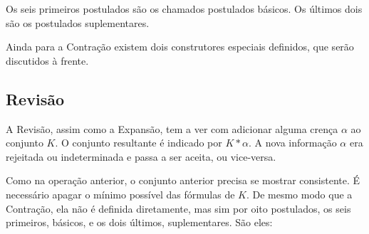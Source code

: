Os seis primeiros postulados são os chamados postulados básicos. Os últimos dois são os postulados suplementares.

Ainda para a Contração existem dois construtores especiais definidos, que serão discutidos à frente.

\subsection{Revisão}

A Revisão, assim como a Expansão, tem a ver com adicionar alguma crença $ \alpha $ ao conjunto $ K $. O conjunto resultante é indicado por $ K \ast \alpha $. A nova informação $ \alpha $ era rejeitada ou indeterminada e passa a ser aceita, ou vice-versa.

Como na operação anterior, o conjunto anterior precisa se mostrar consistente. É necessário apagar o mínimo possível das fórmulas de $ K $. De mesmo modo que a Contração, ela não é definida diretamente, mas sim por oito postulados, os seis primeiros, básicos, e os dois últimos, suplementares. São eles:

